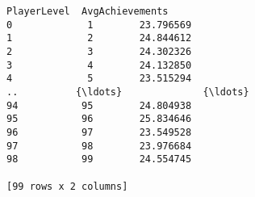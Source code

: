 \documentclass[11pt]{article}
\begin{document}
    \begin{Verbatim}[commandchars=\\\{\}]
    PlayerLevel  AvgAchievements
0             1        23.796569
1             2        24.844612
2             3        24.302326
3             4        24.132850
4             5        23.515294
..          {\ldots}              {\ldots}
94           95        24.804938
95           96        25.834646
96           97        23.549528
97           98        23.976684
98           99        24.554745

[99 rows x 2 columns]
    \end{Verbatim}

    \begin{center}
    \end{center}
    { \hspace*{\fill} \\}
    
\end{document}
